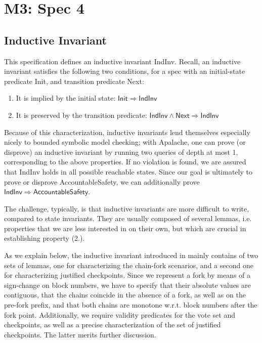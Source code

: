 
\section{M3: Spec 4}

\subsection{Inductive Invariant} 
This specification defines an inductive invariant \textsf{IndInv}. Recall, an inductive invariant satisfies the following two conditions, for a spec with an initial-state predicate \textsf{Init}, and transition predicate \textsf{Next}:
\begin{enumerate}
	\item It is implied by the initial state: $\mathsf{Init} \Rightarrow \mathsf{IndInv}$
	\item It is preserved by the transition predicate: $\mathsf{IndInv} \land \mathsf{Next} \Rightarrow \mathsf{IndInv}$
\end{enumerate}
Because of this characterization, inductive invariants lend themselves especially nicely to bounded symbolic model checking; with Apalache, one can prove (or disprove) an inductive invariant by running two queries of depth at most 1, corresponding to the above properties.
If no violation is found, we are assured that \textsf{IndInv} holds in all possible reachable states.
Since our goal is ultimately to prove or disprove \textsf{AccountableSafety}, we can additionally prove $\textsf{IndInv} \Rightarrow \mathsf{AccountableSafety}$.

The challenge, typically, is that inductive invariants are more difficult to write, compared to state invariants.
They are usually composed of several lemmas, i.e. properties that we are less interested in on their own, but which are crucial in establishing property (2.).

As we explain below, the inductive invariant introduced in \SpecFour{} mainly contains of two sets of lemmas, one for characterizing the chain-fork scenarios, and a second one for characterizing justified checkpoints.
Since we represent a fork by means of a sign-change on block numbers, we have to specify that their absolute values are contiguous, that the chains coincide in the absence of a fork, as well as on the pre-fork prefix, and that both chains are monotone w.r.t. block numbers after the fork point.
Additionally, we require validity predicates for the vote set and checkpoints, as well as a precise characterization of the set of justified checkpoints. The latter merits further discussion.

